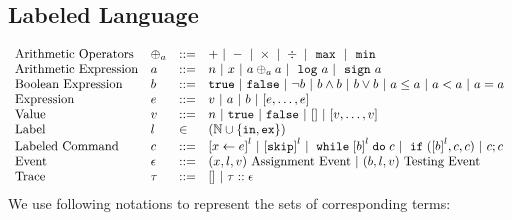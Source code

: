 %
%
\subsection{Labeled Language}
\[
\begin{array}{llll}
\mbox{Arithmetic Operators} 
& \oplus_a & ::= & + ~|~ - ~|~ \times 
%
~|~ \div ~|~ \emax ~|~ \emin
\\  
%
%
\mbox{Arithmetic Expression} 
& \aexpr & ::= & 
n ~|~ {x} ~|~ \aexpr \oplus_a \aexpr  
 ~|~ \elog \aexpr  ~|~ \esign \aexpr
\\
%
\mbox{Boolean Expression} & \bexpr & ::= & 
%
\etrue ~|~ \efalse  ~|~ \neg \bexpr
 ~|~ \bexpr \land \bexpr
%
~|~ \bexpr \lor \bexpr
~|~ \aexpr \leq \aexpr 
~|~ \aexpr < \aexpr 
~|~ \aexpr = \aexpr 
\\
%
\mbox{Expression} & \expr & ::= & v ~|~ \aexpr ~|~ \bexpr ~|~ [\expr, \dots, \expr]
\\  
%
\mbox{Value} 
& v & ::= & { n ~|~ \etrue ~|~ \efalse ~|~ [] ~|~ [v, \dots, v]} \\
%
\mbox{Label} 
& l & \in & (\mathbb{N} \cup \{\lin, \lex\}) 
\\ 
%
\mbox{Labeled Command} 
& {c} & ::= &  
\clabel{\assign{x}{\expr}}^l 
~|~  \clabel{\eskip}^l
~|~ \ewhile \clabel{\bexpr}^{l} \edo {c}
~|~ \eif(\clabel{\bexpr}^{l} , {c}, {c}) 
~|~ {c};{c}  
\\ 
\mbox{Event} 
& \event & ::= & 
({x}, l, v) ~ \mbox{Assignment Event} 
~|~(\bexpr, l, v) ~ \mbox{Testing Event}
\\
\mbox{Trace} & \trace
& ::= & [] ~|~ \trace :: \event
\\
\end{array}
\]
We use following notations to represent the sets of corresponding terms:
